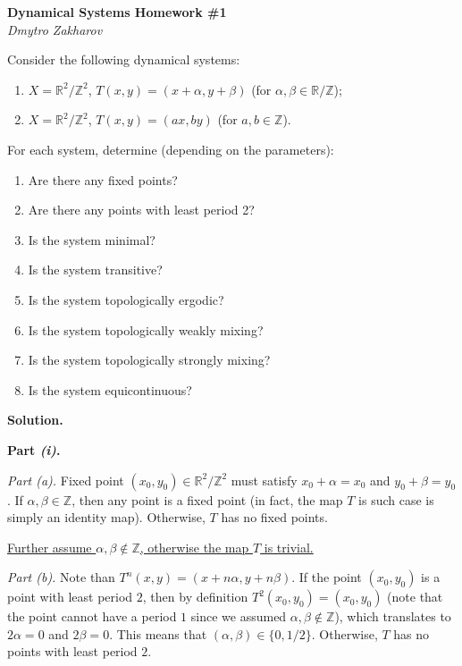 \documentclass{template}
\begin{document}
\begin{center}
    \Large \textcolor{blue!70!black}{\textbf{Dynamical Systems Homework \#1}} \\
    \normalsize \textit{Dmytro Zakharov}
\end{center}

\begin{problem}[Exercise 1]
    Consider the following dynamical systems:
    \begin{enumerate}
        \item[(i)] $X=\mathbb{R}^2/\mathbb{Z}^2$, $T(x,y) = (x+\alpha,y+\beta)$ (for $\alpha,\beta \in \mathbb{R}/\mathbb{Z}$);
        \item[(ii)] $X=\mathbb{R}^2/\mathbb{Z}^2$, $T(x,y) = (ax, by)$ (for $a,b \in \mathbb{Z}$). 
    \end{enumerate}
    For each system, determine (depending on the parameters):
    \begin{enumerate}
        \item[(a)] Are there any fixed points?
        \item[(b)] Are there any points with least period 2?
        \item[(c)] Is the system minimal?
        \item[(d)] Is the system transitive?
        \item[(e)] Is the system topologically ergodic?
        \item[(f)] Is the system topologically weakly mixing?
        \item[(g)] Is the system topologically strongly mixing?
        \item[(h)] Is the system equicontinuous?       
    \end{enumerate}
\end{problem}

\textbf{Solution.} 

\textcolor{blue!70!black}{\textbf{Part \textit{(i)}.}}

\textit{Part (a).} Fixed point $(x_0,y_0) \in \mathbb{R}^2/\mathbb{Z}^2$ must
satisfy $x_0+\alpha=x_0$ and $y_0+\beta=y_0$. If $\alpha,\beta \in \mathbb{Z}$,
then any point is a fixed point (in fact, the map $T$ is such case is simply an
identity map). Otherwise, $T$ has no fixed points.

\underline{Further assume $\alpha,\beta \not\in \mathbb{Z}$, otherwise the map
$T$ is trivial.}

\textit{Part (b).} Note than $T^n(x,y) = (x+n\alpha,y+n\beta)$. If the point
$(x_0,y_0)$ is a point with least period $2$, then by definition $T^2(x_0,y_0) =
(x_0,y_0)$ (note that the point cannot have a period $1$ since we assumed
$\alpha,\beta \not\in \mathbb{Z}$), which translates to $2\alpha=0$ and
$2\beta=0$. This means that \textcolor{green!50!black}{$(\alpha,\beta) \in
\{0,1/2\}$}. Otherwise, $T$ has no points with least period $2$.
\end{document}
